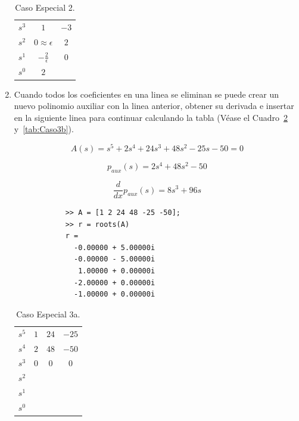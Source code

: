 \begin{enumerate}
            \begin{table}[htbp]
                \centering
                \begin{tabular}{c|c c}
                $s^3$ & $1$ & $-3$ \\
                $s^2$ & $0\approx\epsilon$ & $2$ \\
                $s^1$ & $-\frac{2}{\epsilon}$ & $0$ \\
                $s^0$ & $2$
                \end{tabular}
                \caption{\label{tab:Caso2}Caso Especial 2.}
            \end{table}

            \item Cuando todos los coeficientes en una linea se eliminan se puede crear un nuevo polinomio auxiliar con la linea anterior, obtener su derivada e insertar en la siguiente linea para continuar calculando la tabla (Véase el Cuadro~\ref{tab:Caso3a} y~\ref{tab:Caso3b}).

            \begin{equation*}
            A(s) = s^5 + 2 s^4 + 24 s^3 + 48 s^2 - 25 s - 50 = 0
            \end{equation*}

            \begin{equation*}
            p_{aux}(s) = 2 s^4 + 48 s^2 - 50
            \end{equation*}

            \begin{equation*}
            \frac{d}{d x} p_{aux}(s) = 8 s^3 + 96 s
            \end{equation*}

            \begin{verbatim}
            >> A = [1 2 24 48 -25 -50];
            >> r = roots(A)
            r =
              -0.00000 + 5.00000i
              -0.00000 - 5.00000i
               1.00000 + 0.00000i
              -2.00000 + 0.00000i
              -1.00000 + 0.00000i
            \end{verbatim}

            \begin{table}[htbp]
                \centering
                \begin{tabular}{c|c c c}
                $s^5$ & $1$ & $24$ & $-25$ \\
                $s^4$ & $2$ & $48$ & $-50$ \\
                $s^3$ & $0$ & $0$  & $0$   \\
                $s^2$ \\
                $s^1$ \\
                $s^0$
                \end{tabular}
                \caption{\label{tab:Caso3a}Caso Especial 3a.}
            \end{table}


\end{enumerate}
